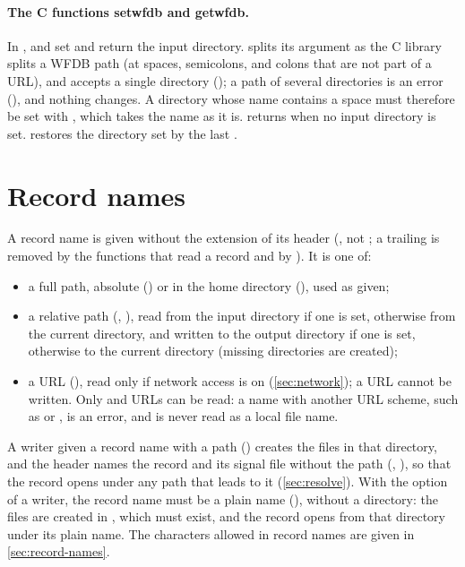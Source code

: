 \paragraph{The C functions setwfdb and getwfdb.} In \wfdbx{},
 and  set and return the input directory.
 splits its argument as the C library splits a WFDB path (at
spaces, semicolons, and colons that are not part of a URL), and accepts a
single directory (); a path of several directories is an
error (), and
nothing changes. A directory whose name contains a space must therefore be
set with , which takes the name as it is.
 returns  when no input directory is set.
 restores the directory set by the last .

\section{Record names}
\label{sec:record-paths}

A record name is given without the extension  of its header
(, not ; a trailing  is removed by the
functions that read a record and by ). It is one of:
\begin{itemize}
\item a full path, absolute () or in the home
  directory (), used as given;
\item a relative path (, ), read from the input
  directory if one is set, otherwise from the current directory, and
  written to the output directory if one is set, otherwise to the current
  directory (missing directories are created);
\item a URL (), read only
  if network access is on (\cref{sec:network}); a URL cannot be written.
  Only  and  URLs can be read: a name with
  another URL scheme, such as  or , is an error,
  and is never read as a local file name.
\end{itemize}
A writer given a record name with a path () creates the files
in that directory, and the header names the record and its signal file
without the path (, ), so that the record opens
under any path that leads to it (\cref{sec:resolve}). With the
 option of a writer, the record name must be a plain name
(), without a directory: the files are created in ,
which must exist, and the record opens from that directory under its plain
name. The characters allowed in record names are given in
\cref{sec:record-names}.

